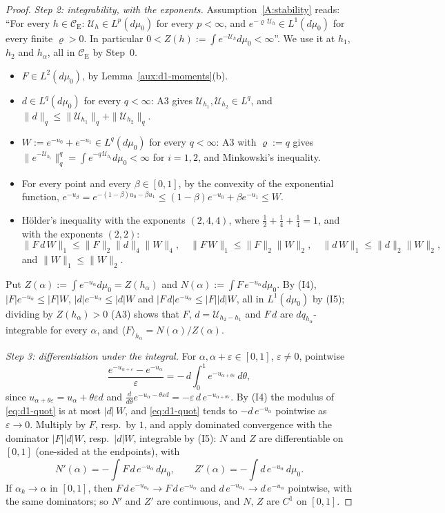 \documentclass[11pt,a4paper]{article}
\theoremstyle{plain}
\theoremstyle{definition}
\theoremstyle{plain}
\theoremstyle{definition}
\newcommand{\CE}{\mathcal{C}_{\mathrm E}}
\newcommand{\ev}[2]{\langle #1\rangle_{#2}}            %
\newcommand{\Uc}{\mathcal U}
\newcommand{\dmu}{d\mu_0}
\begin{document}
\begin{proof}
\emph{Step 2: integrability, with the exponents.} Assumption~\ref{A:stability} reads: ``For every $h\in\CE$: $\Uc_h\in L^p(d\mu_0)$ for every $p<\infty$, and
$e^{-\varrho\,\Uc_h}\in L^1(d\mu_0)$ for every finite $\varrho>0$. In particular
$0<Z(h):=\int e^{-\Uc_h}d\mu_0<\infty$''. We use it at $h_1$, $h_2$ and $h_\alpha$, all in
$\CE$ by Step~0.
\begin{itemize}
\item[(I1)] $F\in L^2(\dmu)$, by Lemma~\ref{aux:d1-moments}(b).
\item[(I2)] $d\in L^q(\dmu)$ for every $q<\infty$: A3 gives $\Uc_{h_1},\Uc_{h_2}\in L^q$, and
$\|d\|_q\le\|\Uc_{h_1}\|_q+\|\Uc_{h_2}\|_q$.
\item[(I3)] $W:=e^{-u_0}+e^{-u_1}\in L^q(\dmu)$ for every $q<\infty$: A3 with $\varrho:=q$ gives
$\|e^{-\Uc_{h_i}}\|_q^q=\int e^{-q\,\Uc_{h_i}}d\mu_0<\infty$ for $i=1,2$, and Minkowski's
inequality.
\item[(I4)] For every point and every $\beta\in[0,1]$, by the convexity of the exponential
function, $e^{-u_\beta}=e^{-(1-\beta)u_0-\beta u_1}\le(1-\beta)e^{-u_0}+\beta e^{-u_1}\le W$.
\item[(I5)] H\"older's inequality with the exponents $(2,4,4)$, where
$\frac12+\frac14+\frac14=1$, and with the exponents $(2,2)$:
\[
 \|F\,d\,W\|_1\le\|F\|_2\|d\|_4\|W\|_4,\quad
 \|F\,W\|_1\le\|F\|_2\|W\|_2,\quad \|d\,W\|_1\le\|d\|_2\|W\|_2,
\]
and $\|W\|_1\le\|W\|_2$.
\end{itemize}
Put $Z(\alpha):=\int e^{-u_\alpha}d\mu_0=Z(h_\alpha)$ and $N(\alpha):=\int F\,e^{-u_\alpha}d\mu_0$.
By (I4), $|F|e^{-u_\alpha}\le|F|W$, $|d|e^{-u_\alpha}\le|d|W$ and
$|F\,d|e^{-u_\alpha}\le|F||d|W$, all in $L^1(\dmu)$ by (I5); dividing by $Z(h_\alpha)>0$ (A3)
shows that $F$, $d=\Uc_{h_2-h_1}$ and $F\,d$ are $dq_{h_\alpha}$-integrable for every $\alpha$,
and $\ev{F}{h_\alpha}=N(\alpha)/Z(\alpha)$.

\emph{Step 3: differentiation under the integral.} For $\alpha,\alpha+\varepsilon\in[0,1]$,
$\varepsilon\ne0$, pointwise
\begin{equation}\label{eq:d1-quot}
 \frac{e^{-u_{\alpha+\varepsilon}}-e^{-u_\alpha}}{\varepsilon}
 =-\,d\int_0^1e^{-u_{\alpha+\theta\varepsilon}}\,d\theta ,
\end{equation}
since $u_{\alpha+\theta\varepsilon}=u_\alpha+\theta\varepsilon d$ and
$\frac{d}{d\theta}e^{-u_\alpha-\theta\varepsilon d}=-\varepsilon\,d\,
e^{-u_{\alpha+\theta\varepsilon}}$. By (I4) the modulus of \eqref{eq:d1-quot} is at most
$|d|\,W$, and \eqref{eq:d1-quot} tends to $-d\,e^{-u_\alpha}$ pointwise as $\varepsilon\to0$.
Multiply by $F$, resp.\ by $1$, and apply dominated convergence with the dominator
$|F||d|W$, resp.\ $|d|W$, integrable by (I5): $N$ and $Z$ are differentiable on $[0,1]$
(one-sided at the endpoints), with
\[
 N'(\alpha)=-\int F\,d\,e^{-u_\alpha}\,d\mu_0,\qquad Z'(\alpha)=-\int d\,e^{-u_\alpha}\,d\mu_0 .
\]
If $\alpha_k\to\alpha$ in $[0,1]$, then $F\,d\,e^{-u_{\alpha_k}}\to F\,d\,e^{-u_\alpha}$ and
$d\,e^{-u_{\alpha_k}}\to d\,e^{-u_\alpha}$ pointwise, with the same dominators; so $N'$ and $Z'$
are continuous, and $N$, $Z$ are $C^1$ on $[0,1]$.


\end{proof}
\end{document}
